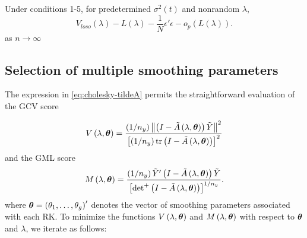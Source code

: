 \begin{theorem} \label{thm:asymptotic-equiv-of-losocv}
Under conditions 1-5, for predetermined $\sigma^2\left(t\right)$ and nonrandom $\lambda$, 
\begin{equation}
V_{loso}\left(\lambda \right) - L\left(\lambda \right) - \frac{1}{N} \epsilon'\epsilon - o_p\left( L\left(\lambda \right)\right).
\end{equation}
\noindent
as $n \rightarrow \infty$ 
\end{theorem}
  
\vspace{0.8in} 


\subsection{Selection of multiple smoothing parameters}

The expression in \ref{eq:cholesky-tildeA} permits the straightforward evaluation of the GCV score

\begin{equation} \label{eq:general-GCV-score}
V\left(\lambda, \mbox{\boldmath $\theta$} \right) = \frac{\left( 1/n_y \right)  \left \lVert \left(I - \tilde{A}\left(\lambda, \mbox{\boldmath $\theta$} \right)\right) \tilde{Y} \right\rVert^2}{\left[\left( 1/n_y \right) \textup{tr} \left(I - \tilde{A}\left(\lambda, \mbox{\boldmath $\theta$} \right)\right)  \right]^2}
\end{equation}
\noindent
and the GML score
\begin{equation} \label{eq:general-GML-score}
M\left(\lambda, \mbox{\boldmath $\theta$} \right) = \frac{\left( 1/n_y \right) \tilde{Y}' \left(I - \tilde{A}\left(\lambda, \mbox{\boldmath $\theta$} \right)\right) \tilde{Y} }{\left[ \mbox{det}^+\left(I - \tilde{A}\left(\lambda, \mbox{\boldmath $\theta$} \right)\right)  \right]^{1/n_y}}.
\end{equation}
\noindent
where $\mbox{\boldmath $\theta$} = \left(\theta_1,\dots, \theta_g\right)'$ denotes the vector of smoothing parameters associated with each RK.
\bigskip
To minimize the functions $V\left(\lambda, \mbox{\boldmath $\theta$}\right)$ and $M\left(\lambda, \mbox{\boldmath $\theta$}\right)$ with respect to $\mbox{\boldmath $\theta$}$ and $\lambda$, we iterate as follows:

